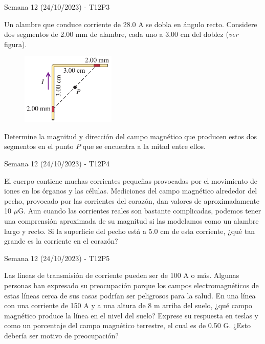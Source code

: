 \begin{frame}{Semana 12 (24/10/2023) - T12P3}

    Un alambre que conduce corriente de 28.0 A se dobla en
ángulo recto. Considere dos segmentos de 2.00 mm de alambre, cada uno a 3.00 cm del doblez (\textit{ver} figura).

\begin{figure}
    \centering
    \includegraphics[width=0.4\textwidth]{figures/t13p3.png}
\end{figure}

Determine la magnitud y dirección del campo magnético que producen
estos dos segmentos en el punto $P$
que se encuentra a la mitad entre
ellos.

\end{frame}

\begin{frame}{Semana 12 (24/10/2023) - T12P4}

El cuerpo contiene muchas
corrientes pequeñas provocadas por el movimiento de iones en los
órganos y las células. Mediciones del campo magnético alrededor del
pecho, provocado por las corrientes del corazón, dan valores de aproximadamente 10 $\mu$G. Aun cuando las corrientes reales son bastante
complicadas, podemos tener una comprensión aproximada de su magnitud si las modelamos como un alambre largo y recto. Si la superficie
del pecho está a 5.0 cm de esta corriente, ¿qué tan grande es la corriente en el corazón?
    
\end{frame}

\begin{frame}{Semana 12 (24/10/2023) - T12P5}

     Las líneas de transmisión de corriente pueden ser de 100 A o más. Algunas personas han expresado su
preocupación porque los campos electromagnéticos de estas líneas cerca de sus casas podrían ser peligrosos para la salud. En una línea
con una corriente de 150 A y a una altura de 8 m arriba del suelo, ¿qué
campo magnético produce la línea en el nivel del suelo? Exprese su
respuesta en teslas y como un porcentaje del campo magnético terrestre,
el cual es de 0.50 G. ¿Esto debería ser motivo de preocupación?
    
\end{frame}

